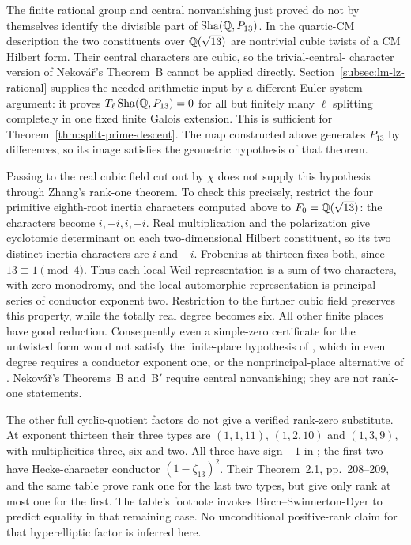 The finite rational group and central nonvanishing just proved do
not by themselves identify the divisible part of
$\operatorname{Sha}(\mathbb Q,P_{13})$. In the quartic-CM description the two constituents
over $\mathbb Q(\sqrt{13})$ are nontrivial cubic twists of a CM Hilbert
form. Their central characters are cubic, so the trivial-central-
character version of Nekov\'a\v r's Theorem~B cannot be applied
directly. Section~\ref{subsec:lm-lz-rational} supplies the needed
arithmetic input by a different Euler-system argument: it proves
$T_\ell\operatorname{Sha}(\mathbb Q,P_{13})=0$ for all but finitely many $\ell$ splitting
completely in one fixed finite Galois extension. This is sufficient
for Theorem~\ref{thm:split-prime-descent}. The map constructed above
generates $P_{13}$ by differences, so its image satisfies the
geometric hypothesis of that theorem.

Passing to the real cubic field cut out by $\chi$ does not supply
this hypothesis through Zhang's rank-one theorem. To check this
precisely, restrict the four primitive eighth-root inertia characters
computed above to $F_0=\mathbb Q(\sqrt{13})$: the characters become
$i,-i,i,-i$. Real multiplication and the polarization give
cyclotomic determinant on each two-dimensional Hilbert constituent,
so its two distinct inertia characters are $i$ and $-i$.
Frobenius at thirteen fixes both, since $13\equiv1\pmod4$.
Thus each local Weil representation is a sum of two characters,
with zero monodromy, and the local automorphic representation is
principal series of conductor exponent two. Restriction to the
further cubic field preserves this property, while the totally
real degree becomes six. All other finite places have good reduction.
Consequently even a simple-zero certificate for the untwisted form
would not satisfy the finite-place hypothesis of
\citet[Theorem~A and its preceding setup, p.~28]{Zhang2001},
which in even degree requires a conductor exponent one, or the
nonprincipal-place alternative of
\citet[Theorem~4.3.2, p.~588]{Zhang2010}.
Nekov\'a\v r's Theorems~B and~B$'$ require central nonvanishing;
they are not rank-one statements.

The other full cyclic-quotient factors do not give a verified
rank-zero substitute. At exponent thirteen their three types are
$(1,1,11)$, $(1,2,10)$ and $(1,3,9)$, with multiplicities three,
six and two. All three have sign $-1$ in
\citet[table on p.~219]{GrossRohrlich1978}; the first two have
Hecke-character conductor $(1-\zeta_{13})^2$.
Their Theorem~2.1, pp.~208--209, and the same table prove rank one
for the last two types, but give only rank at most one for the first.
The table's footnote invokes Birch--Swinnerton-Dyer to predict
equality in that remaining case. No unconditional positive-rank
claim for that hyperelliptic factor is inferred here.
